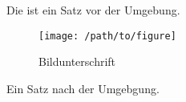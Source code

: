 Die ist ein Satz vor der Umgebung.
\begin{figure}
    \texttt{[image: /path/to/figure]}
    \caption{Bildunterschrift}
    \label{test}
\end{figure}
Ein Satz nach der Umgebgung.

